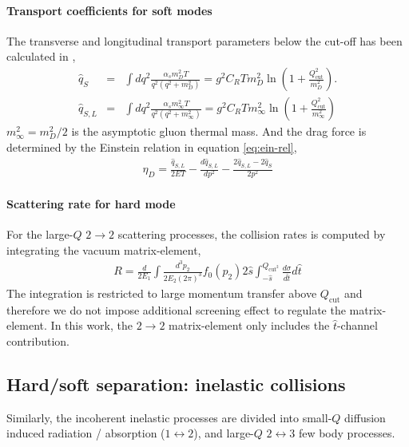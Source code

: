 \paragraph{Transport coefficients for soft modes} The transverse and longitudinal transport parameters below the cut-off has been calculated in \cite{Ghiglieri:2015ala},
\begin{eqnarray}
\hat{q}_S &=& \int dq^2 \frac{\alpha_s m_D^2 T}{q^2 (q^2+m_D^2)} = g^2 C_R T m_D^2  \ln\left(1+\frac{Q_{\textrm{cut}}^2}{m_D^2}\right).
\label{eq:qS} \\
\hat{q}_{S,L} &=& \int dq^2 \frac{\alpha_s m_\infty^2 T}{q^2 (q^2+m_\infty^2)} = g^2 C_R T m_\infty^2  \ln\left(1+\frac{Q_{\textrm{cut}}^2}{m_\infty^2}\right)
\label{eq:qSL} 
\end{eqnarray}
$m_\infty^2 = m_D^2/2$ is the asymptotic gluon thermal mass. 
And the drag force is determined by the Einstein relation in equation \ref{eq:ein-rel},
\begin{eqnarray}
\eta_D = \frac{\hat{q}_{S,L}}{2ET} - \frac{d\hat{q}_{S,L}}{dp^2} - \frac{2\hat{q}_{S,L} - 2\hat{q}_S}{2p^2}
\end{eqnarray}

\paragraph{Scattering rate for hard mode} For the large-$Q$ $2\rightarrow 2$ scattering processes, the collision rates is computed by integrating the vacuum matrix-element, 
\begin{eqnarray}
R = \frac{d}{2E_1}\int  \frac{d^3p_2}{2E_2(2\pi)^3} f_0(p_2)2\hat{s} \int_{-\hat{s}}^{Q_{\textrm{cut}^2}}\frac{d\sigma}{d\hat{t}}d\hat{t}
\end{eqnarray}
The integration is restricted to large momentum transfer above $Q_{\textrm{cut}}$ and therefore we do not impose additional screening effect to regulate the matrix-element.
In this work, the $2\rightarrow 2$ matrix-element only includes the $\hat{t}$-channel contribution.

\subsection{Hard/soft separation: inelastic collisions}
Similarly, the incoherent inelastic processes are divided into small-$Q$ diffusion induced radiation / absorption ($1\leftrightarrow 2$), and large-$Q$ $2\leftrightarrow 3$ few body processes.

